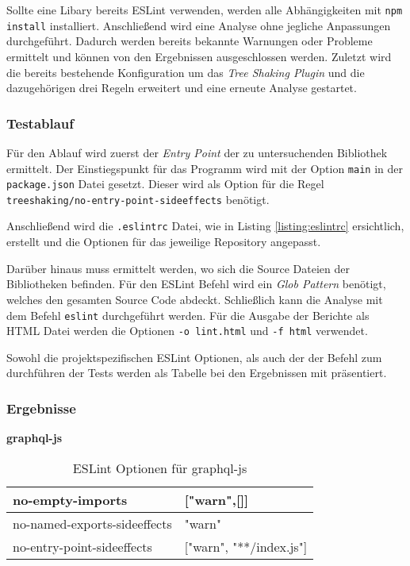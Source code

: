 Sollte eine Libary bereits ESLint verwenden, werden alle Abhängigkeiten mit \lstinline{npm install} installiert. Anschließend wird eine Analyse ohne jegliche Anpassungen durchgeführt. Dadurch werden bereits bekannte Warnungen oder Probleme ermittelt und können von den Ergebnissen ausgeschlossen werden. Zuletzt  wird die bereits bestehende Konfiguration um das \textit{Tree Shaking Plugin} und die dazugehörigen drei Regeln erweitert und eine erneute Analyse gestartet.

\subsubsection{Testablauf}

Für den Ablauf wird zuerst der \textit{Entry Point} der zu untersuchenden Bibliothek ermittelt. Der Einstiegspunkt für das Programm wird mit der Option \lstinline{main} in der \lstinline{package.json} Datei gesetzt. Dieser wird als Option für die Regel \lstinline{treeshaking/no-entry-point-sideeffects} benötigt.

Anschließend wird die \lstinline{.eslintrc} Datei, wie in Listing \ref{listing:eslintrc} ersichtlich, erstellt und die Optionen für das jeweilige Repository angepasst.

Darüber hinaus muss ermittelt werden, wo sich die Source Dateien der Bibliotheken befinden. Für den ESLint Befehl wird ein \textit{Glob Pattern} benötigt, welches den gesamten Source Code abdeckt. Schließlich kann die Analyse mit dem Befehl \lstinline{eslint} durchgeführt werden. Für die Ausgabe der Berichte als HTML Datei werden die Optionen \lstinline{-o lint.html} und \lstinline{-f html} verwendet.

Sowohl die projektspezifischen ESLint Optionen, als auch der der Befehl zum durchführen der Tests werden als Tabelle bei den Ergebnissen mit präsentiert. 

\subsubsection{Ergebnisse}

\textbf{graphql-js}
\begin{table}[H]
\centering
\caption{ESLint Optionen für graphql-js}
\label{tbl:graphql-js-options}
\begin{tabular}{|l|l|}
\hline
no-empty-imports             & {[}"warn",{[}{]}{]}         \\ \hline
no-named-exports-sideeffects & "warn"                      \\ \hline
no-entry-point-sideeffects   & {[}"warn", "**/index.js"{]} \\ \hline
\end{tabular}
\end{table}

